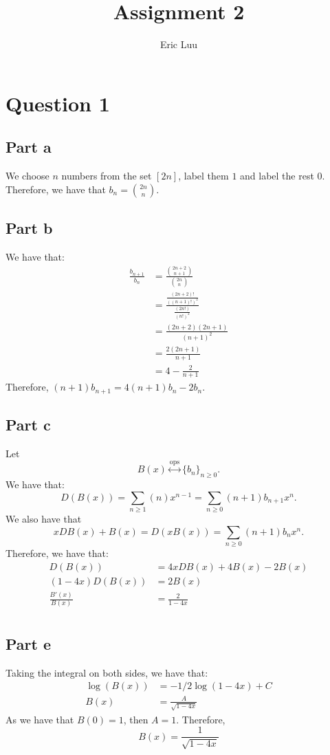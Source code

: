 \documentclass[]{article}
\title{Assignment 2}
\author{Eric Luu}
\newcommand{\ops}{\overset{\text{ops}}{\leftrightarrow}}
\begin{document}
\maketitle
\section{Question 1}
\subsection{Part a}
We choose $n$ numbers from the set $[2n]$, label them $1$ and label the rest $0$. Therefore, we have that $b_n = \binom{2n}{n}$.
\subsection{Part b}
We have that:
\begin{align*}
	\frac{b_{n+1}}{b_n} &= \frac{\binom{2n + 2}{n+1}}{\binom{2n}{n}}\\
	&= 
	\frac{\frac{(2n + 2)!}{((n+1)!)^2}}{\frac{(2n!)}{(n!)^2}}\\
	&=
	\frac{(2n + 2)(2n + 1)}{(n+1)^2}\\
	&=\frac{2(2n + 1)}{n+1}\\
	&= 4 - \frac{2}{n+ 1}
\end{align*}
Therefore, $(n+1)b_{n+1} = 4(n+1) b_n - 2 b_n$. 
\subsection*{Part c}
Let \begin{equation}
	B(x) \ops \lbrace b_n \rbrace_{n \geq 0}. 
\end{equation}
We have that:
\begin{equation}
	D (B(x)) = \sum_{n \geq 1} (n) x^{n-1} = \sum_{n \geq 0} (n + 1) b_{n+1} x^n.
\end{equation}
We also have that \begin{equation}
	x D B(x) + B(x) = D (x B(x)) = \sum_{n \geq 0} (n + 1) b_n x^{n}. 
\end{equation}
Therefore, we have that:
\begin{align*}
	D(B(x)) &= 4 xD B(x) + 4 B(x) - 2 B(x)\\
	(1-4x) D(B(x))&= 2 B(x)\\
	\frac{B'(x)}{B(x)} &= \frac{2}{1-4x}\\
\end{align*}
\subsection{Part e}
Taking the integral on both sides, we have that:
\begin{align*}
	\log(B(x)) &= -1/2 \log(1-4x) + C\\
	B(x) &= \frac{A}{\sqrt{1-4x}}
\end{align*}
As we have that $B(0) = 1$, then $A = 1$. Therefore,
\begin{equation}
	B(x) = \frac{1}{\sqrt{1-4x}}
\end{equation}
\end{document}

